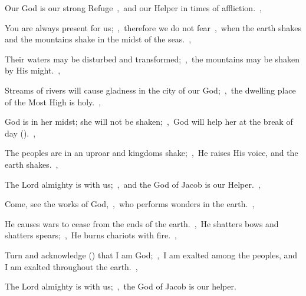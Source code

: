 \documentclass[12pt,twoside,a5paper]{article}
\begin{document}

\begin{normalparskip}
  Our God is our strong Refuge~\sep\ and our Helper in times of affliction.~\sep


  You are always present for us;~\sep\ therefore we do not fear~\sep\ when the earth shakes and the mountains shake in the midst of the seas.~\sep

  Their waters may be disturbed and transformed;~\sep\ the mountains may be shaken by His might.~\sep

  Streams of rivers will cause gladness in the city of our God;~\sep\ the dwelling place of the Most High is holy.~\sep

  God is in her midst; she will not be shaken;~\sep\ God will help her at the break of day ().~\sep

  The peoples are in an uproar and kingdoms shake;~\sep\ He raises His voice, and the earth shakes.~\sep

  The Lord almighty is with us;~\sep\ and the God of Jacob is our Helper.~\sep

  Come, see the works of God,~\sep\ who performs wonders in the earth.~\sep

  He causes wars to cease from the ends of the earth.~\sep\ He shatters bows and shatters spears;~\sep\ He burns chariots with fire.~\sep

  Turn and acknowledge () that I am God;~\sep\ I am exalted among the peoples, and I am exalted throughout the earth.~\sep

  The Lord almighty is with us;~\sep\ the God of Jacob is our helper.
\end{normalparskip}



\end{document}
